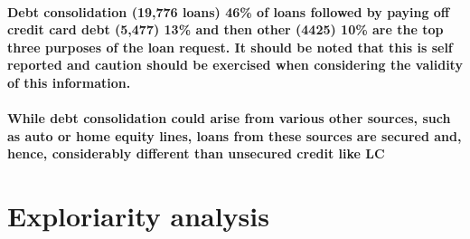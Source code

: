 \documentclass[
]{article}
\begin{document}
\hypertarget{debt-consolidation-19776-loans-46-of-loans-followed-by-paying-off-credit-card-debt-5477-13-and-then-other-4425-10-are-the-top-three-purposes-of-the-loan-request.-it-should-be-noted-that-this-is-self-reported-and-caution-should-be-exercised-when-considering-the-validity-of-this-information.}{%
\paragraph{Debt consolidation (19,776 loans) 46\% of loans followed by
paying off credit card debt (5,477) 13\% and then other (4425) 10\% are
the top three purposes of the loan request. It should be noted that this
is self reported and caution should be exercised when considering the
validity of this
information.}\label{debt-consolidation-19776-loans-46-of-loans-followed-by-paying-off-credit-card-debt-5477-13-and-then-other-4425-10-are-the-top-three-purposes-of-the-loan-request.-it-should-be-noted-that-this-is-self-reported-and-caution-should-be-exercised-when-considering-the-validity-of-this-information.}}

\hypertarget{while-debt-consolidation-could-arise-from-various-other-sources-such-as-auto-or-home-equity-lines-loans-from-these-sources-are-secured-and-hence-considerably-different-than-unsecured-credit-like-lc}{%
\paragraph{While debt consolidation could arise from various other
sources, such as auto or home equity lines, loans from these sources are
secured and, hence, considerably different than unsecured credit like
LC}\label{while-debt-consolidation-could-arise-from-various-other-sources-such-as-auto-or-home-equity-lines-loans-from-these-sources-are-secured-and-hence-considerably-different-than-unsecured-credit-like-lc}}

\hypertarget{exploriarity-analysis}{%
\section{Exploriarity analysis}\label{exploriarity-analysis}}
\end{document}
